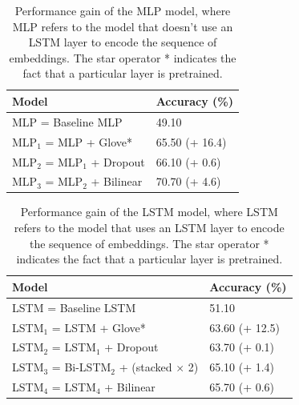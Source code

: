 \documentclass[11pt,a4paper]{article}
\begin{document}
	\begin{table}[H]
		\centering
		\begin{tabular}{@{}ll@{}}
			\toprule
			\textbf{Model}               & \textbf{Accuracy (\%)} \\ \midrule
			MLP = Baseline MLP           & 49.10              \\
			MLP$_1$ = MLP + Glove*       & 65.50 (+ 16.4)     \\
			MLP$_2$ = MLP$_1$ + Dropout  & 66.10 (+ 0.6)      \\
			MLP$_3$ = MLP$_2$ + Bilinear & 70.70 (+ 4.6)     \\ \bottomrule
		\end{tabular}
		\caption{Performance gain of the MLP model, where MLP refers to the model that doesn't use an LSTM layer to encode the sequence of embeddings. The star operator * indicates the fact that a particular layer is pretrained.}
		\label{tab:MLP-model}
	\end{table}
	
	\begin{table}[H]
		\centering
		\begin{tabular}{@{}ll@{}}
			\toprule
			\textbf{Model}                                        & \textbf{Accuracy (\%)} \\ \midrule
			LSTM = Baseline LSTM                                  & 51.10                  \\
			LSTM$_1$ = LSTM + Glove*                              & 63.60 (+ 12.5)         \\
			LSTM$_2$ = LSTM$_1$ + Dropout                         & 63.70 (+ 0.1)          \\
			LSTM$_3$ = Bi-LSTM$_2$ + (stacked $\times$ 2) & 65.10 (+ 1.4)          \\
			LSTM$_4$ = LSTM$_4$ + Bilinear                        & 65.70 (+ 0.6)       \\ \bottomrule  
		\end{tabular}
		\caption{Performance gain of the LSTM model, where LSTM refers to the model that uses an LSTM layer to encode the sequence of embeddings. The star operator * indicates the fact that a particular layer is pretrained.}
		\label{tab:LSTM-model}
	\end{table}
\end{document}
